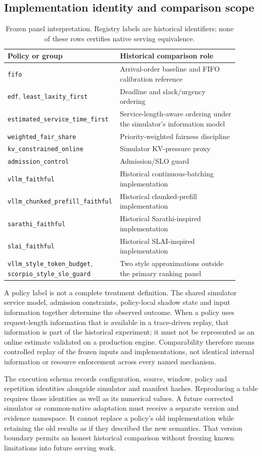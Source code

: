 \subsection{Implementation identity and comparison scope}
\begin{table}[t]\centering
\caption{Frozen panel interpretation. Registry labels are historical
identifiers; none of these rows certifies native serving equivalence.}\label{tab:panel}
\begin{tabular}{p{0.40\linewidth}p{0.51\linewidth}}\toprule
Policy or group & Historical comparison role\\\midrule
\texttt{fifo} & Arrival-order baseline and FIFO calibration reference\\
\texttt{edf}, \texttt{least\_laxity\_first} & Deadline and slack/urgency ordering\\
\texttt{estimated\_service\_time\_first} & Service-length-aware ordering under the simulator's information model\\
\texttt{weighted\_fair\_share} & Priority-weighted fairness discipline\\
\texttt{kv\_constrained\_online} & Simulator KV-pressure proxy\\
\texttt{admission\_control} & Admission/SLO guard\\
\texttt{vllm\_faithful} & Historical continuous-batching implementation\\
\texttt{vllm\_chunked\_prefill\_faithful} & Historical chunked-prefill implementation\\
\texttt{sarathi\_faithful} & Historical Sarathi-inspired implementation\\
\texttt{slai\_faithful} & Historical SLAI-inspired implementation\\
\texttt{vllm\_style\_token\_budget}, \texttt{scorpio\_style\_slo\_guard} & Two style approximations outside the primary ranking panel\\\bottomrule
\end{tabular}
\end{table}
A policy label is not a complete treatment definition. The shared simulator
service model, admission constraints, policy-local shadow state and input
information together determine the observed outcome. When a policy uses
request-length information that is available in a trace-driven replay,
that information is part of the historical experiment; it must not be
represented as an online estimate validated on a production engine.
Comparability therefore means controlled replay of the frozen inputs and
implementations, not identical internal information or resource enforcement
across every named mechanism.

The execution schema records configuration, source, window, policy and
repetition identities alongside simulator and manifest hashes. Reproducing
a table requires those identities as well as its numerical values. A
future corrected simulator or common-native adaptation must receive a
separate version and evidence namespace. It cannot replace a policy's old
implementation while retaining the old results as if they described the
new semantics. That version boundary permits an honest historical
comparison without freezing known limitations into future serving work.
